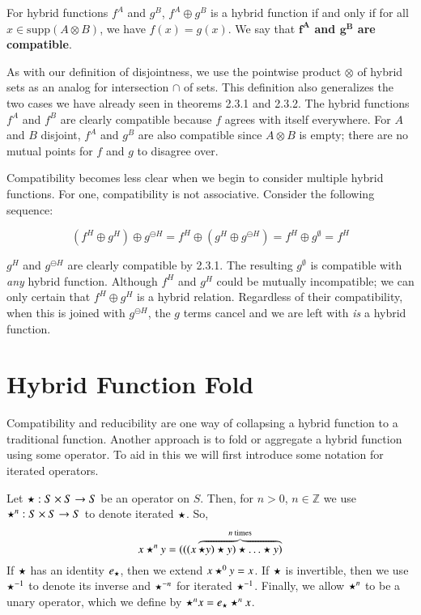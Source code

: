 \begin{definition}
	For hybrid functions $f^A$ and $g^B$, $f^A \oplus g^B$ is a hybrid function
	if and only if for all $x \in \text{supp} (A \otimes B)$, we have $f(x) = g(x)$.
	We say that \textbf{$\boldsymbol{f^A}$ and $\boldsymbol{g^B}$ are compatible}.
\end{definition}


As with our definition of disjointness, we use the pointwise product $\otimes$ 
of hybrid sets as an analog for intersection $\cap$ of sets.
This definition also generalizes the two cases we have already seen in theorems 2.3.1 and 2.3.2.
The hybrid functions $f^A$ and $f^B$ are clearly compatible because $f$ agrees with itself everywhere.
For $A$ and $B$ disjoint, $f^A$ and $g^B$ are also compatible since $A \otimes B$ is empty;
there are no mutual points for $f$ and $g$ to disagree over.

Compatibility becomes less clear when we begin to consider multiple hybrid functions.
For one, compatibility is not associative.
Consider the following sequence:


\begin{equation}
(f^H \oplus g^H) \oplus g^{\ominus H} = f^H \oplus (g^H \oplus g^{\ominus H}) = f^H \oplus g^\emptyset = f^H
\end{equation}

$g^H$ and $g^{\ominus H}$ are clearly compatible by 2.3.1.
The resulting $g^{\emptyset}$ is compatible with \emph{any} hybrid function.
Although $f^H$ and $g^H$ could be mutually incompatible; 
we can only certain that $f^H \oplus g^H$ is a hybrid relation.
Regardless of their compatibility, when this is joined with $g^{\ominus H}$, the $g$ terms cancel
and we are left with \emph{is} a hybrid function.





\section{Hybrid Function Fold}


Compatibility and reducibility are one way of collapsing a hybrid function to a traditional function.
Another approach is to fold or aggregate a hybrid function using some operator.
To aid in this we will first introduce some notation for iterated operators.
\begin{definition}
	Let $\star : S \times S \to S$ be an operator on $S$.
	Then, for $n > 0$, $n \in \mathbb{Z}$ we use $\star^n:S \times S \to S$ to denote iterated $\star$.
	So,
	\begin{equation}
		x \star^n y = (((x \overbrace{\star y) \star y) \star \ldots \star y)}^{n \text{ times}}
	\end{equation}
	If $\star$ has an identity $e_\star$, then we extend $x \star^0 y = x$.
	If $\star$ is invertible, then we use $\star^{-1}$ to denote its inverse and $\star^{-n}$ for iterated $\star^{-1}$.
	Finally, we allow $\star^n$ to be a unary operator, which we define by $\star^n x = e_\star \star^n x$.
\end{definition}

